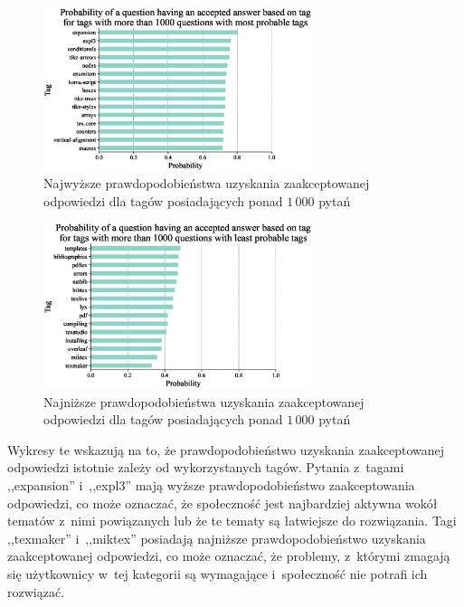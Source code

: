 \documentclass[12pt]{article}
\begin{document}
	\begin{figure}[H]
		\centering
		\includegraphics[width=0.7\textwidth]{tags_top}
		\caption{Najwyższe prawdopodobieństwa uzyskania zaakceptowanej odpowiedzi dla tagów posiadających ponad $1\,000$ pytań}
		\label{fig:najwyzsze-prawdopodobienstwa-uzyskania-odpowiedzi-tagi}
	\end{figure}
	\begin{figure}[H]
		\centering
		\includegraphics[width=0.7\textwidth]{tags_bottom}
		\caption{Najniższe prawdopodobieństwa uzyskania zaakceptowanej odpowiedzi dla tagów posiadających ponad $1\,000$ pytań}
		\label{fig:najnizsze-prawdopodobienstwa-uzyskania-odpowiedzi-tagi}
	\end{figure}
	Wykresy te wskazują na to, że prawdopodobieństwo uzyskania zaakceptowanej odpowiedzi istotnie zależy od wykorzystanych tagów.
	Pytania z~tagami  ,,expansion'' i~,,expl3'' mają wyższe prawdopodobieństwo zaakceptowania odpowiedzi, co może oznaczać, że społeczność jest najbardziej aktywna wokół tematów z~nimi powiązanych lub że te tematy są łatwiejsze do rozwiązania.
	Tagi ,,texmaker'' i~,,miktex'' posiadają najniższe prawdopodobieństwo uzyskania zaakceptowanej odpowiedzi, co może oznaczać, że problemy, z~którymi zmagają się użytkownicy w~tej kategorii są wymagające i~społeczność nie potrafi ich rozwiązać.
\end{document}
